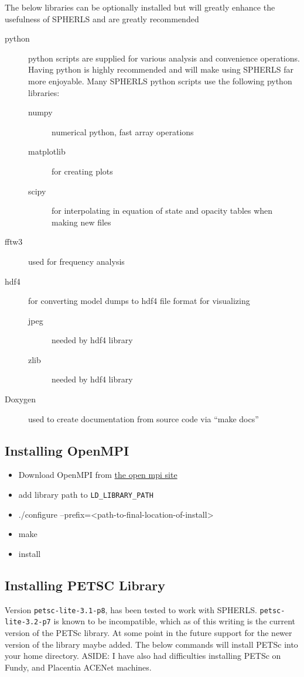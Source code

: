 \documentclass[12pt,a4paper]{book}
\begin{document}
The below libraries can be optionally installed but will greatly enhance the usefulness of SPHERLS and are greatly recommended
\begin{description}
\item[python] python scripts are supplied for various analysis and convenience operations. Having python is highly recommended and will make using SPHERLS far more enjoyable. Many SPHERLS python scripts use the following python libraries:
\begin{description}
  \item[numpy] numerical python, fast array operations
  \item[matplotlib] for creating plots
  \item[scipy] for interpolating in equation of state and opacity tables when making new files
\end{description}
\item[fftw3] used for frequency analysis
\item[hdf4] for converting model dumps to hdf4 file format for visualizing
\begin{description}
  \item[jpeg] needed by hdf4 library
  \item[zlib] needed by hdf4 library
\end{description}
\item[Doxygen] used to create documentation from source code via ``make docs''
\end{description}

\subsection{Installing OpenMPI}
\begin{itemize}
\item Download OpenMPI from \href{http://www.open-mpi.org/software/ompi/v1.6/}{the open mpi site}
\item add library path to {\tt LD\_LIBRARY\_PATH}
\item ./configure --prefix=<path-to-final-location-of-install>
\item make
\item install
\end{itemize}

\subsection{Installing PETSC Library}
Version {\tt petsc-lite-3.1-p8}, has been tested to work with SPHERLS. {\tt petsc-lite-3.2-p7} is known to be incompatible, which as of this writing is the current version of the PETSc library. At some point in the future support for the newer version of the library maybe added. The below commands will install PETSc into your home directory. ASIDE: I have also had difficulties installing PETSc on Fundy, and Placentia ACENet machines.
\end{document}
